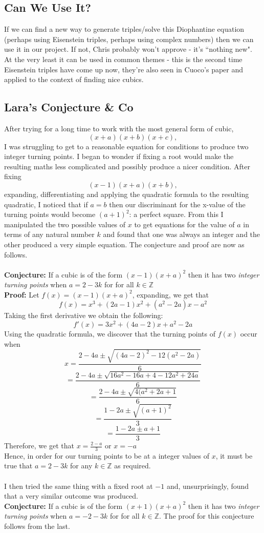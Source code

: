 \documentclass[12pt]{article}
\begin{document}
\subsection{Can We Use It?}
If we can find a new way to generate triples/solve this Diophantine equation (perhaps using Eisenstein triples, perhaps using complex numbers) then we can use it in our project. If not, Chris probably won't approve - it's ``nothing new". At the very least it can be used in common themes - this is the second time Eisenstein triples have come up now, they're also seen in Cuoco's paper \autocite{cuoco2000} and applied to the context of finding nice cubics.

\subsection{Lara's Conjecture \& Co}
After trying for a long time to work with the most general form of cubic, $$(x+a)(x+b)(x+c),$$ I was struggling to get to a reasonable equation for conditions to produce two integer turning points. I began to wonder if fixing a root would make the resulting maths less complicated and possibly produce a nicer condition. After fixing $$(x-1)(x+a)(x+b),$$ expanding, differentiating and applying the quadratic formula to the resulting quadratic, I noticed that if $a=b$ then our discriminant for the x-value of the turning points would become $(a+1)^2$: a perfect square. From this I manipulated the two possible values of $x$ to get equations for the value of $a$ in terms of any natural number $k$ and found that one was always an integer and the other produced a very simple equation. The conjecture and proof are now as follows.\\\\
\textbf{Conjecture:} If a cubic is of the form $(x-1)(x+a)^2$ then it has two \textit{integer turning points} when $a = 2-3k$ for for all $k \in \mathbb{Z}$\\

\textbf{Proof:} Let $f(x)=(x-1)(x+a)^2$, expanding, we get that $$f(x)=x^3+(2a-1)x^2+(a^2-2a)x-a^2$$ 
Taking the first derivative we obtain the following:
$$f'(x)=3x^2+(4a-2)x+a^2-2a$$
Using the quadratic formula, we discover that the turning points of $f(x)$ occur when $$x=\frac{2 - 4a \pm \sqrt{(4a - 2)^2 - 12(a^2 - 2a)}}{6}$$
$$=\frac{2 - 4a \pm \sqrt{16a^2-16a+4-12a^2+24a}}{6}$$
$$=\frac{2 - 4a \pm \sqrt{4(a^2+2a+1}}{6}$$
$$=\frac{1 - 2a \pm \sqrt{(a+1)^2}}{3}$$
$$=\frac{1 - 2a \pm a+1}{3}$$
Therefore, we get that 
$x=\frac{2 - a}{3}$ or $x=-a$\\
Hence, in order for our turning points to be at a integer values of $x$, it must be true that $a=2-3k$ for any $k \in \mathbb{Z}$ as required.\\\\
I then tried the same thing with a fixed root at $-1$ and, unsurprisingly, found that a very similar outcome was produced.\\
\textbf{Conjecture:} If a cubic is of the form $(x+1)(x+a)^2$ then it has two \textit{integer turning points} when $a = -2-3k$ for for all $k \in \mathbb{Z}$. The proof for this conjecture follows from the last.\\\\
\end{document}
